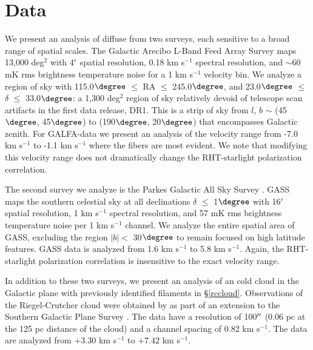 \section{Data}\label{data}
We present an analysis of diffuse \hi from two surveys, each sensitive to a broad range of spatial scales. The Galactic Arecibo L-Band Feed Array \hi Survey \citep[GALFA-\hia;][]{2011ApJS..194...20P} maps 13,000 deg${^2}$ with 4${\mbox{$^\prime$}}$ spatial resolution, 0.18 km s${^{-1}}$ spectral resolution, and ${\sim}$60 mK rms brightness temperature noise for a 1 km s$^{-1}$ velocity bin. We analyze a region of sky with 115.0${\degree}$ ${\le}$ RA ${\le}$ 245.0${\degree}$, and 23.0${\degree}$ ${\le}$ ${\delta}$ ${\le}$ 33.0${\degree}$: a 1,300 deg${^2}$ region of sky relatively devoid of telescope scan artifacts in the first data release, DR1. This is a strip of sky from $l$, $b$ $\sim$ (45$\degree$, 45$\degree$) to (190$\degree$, 20$\degree$) that encompasses Galactic zenith. 
For GALFA-\hi data we present an analysis of the velocity range from -7.0 km s$^{-1}$ to -1.1 km s$^{-1}$ where the fibers are most evident. We note that modifying this velocity range does not dramatically change the RHT-starlight polarization correlation. 

The second survey we analyze is the Parkes Galactic All Sky Survey \citep[GASS;][]{McClureGriffiths:2009dn}.  GASS maps the southern celestial sky at all declinations ${\delta}$ ${\le}$ 1${\degree}$ with 16${\mbox{$^\prime$}}$ spatial resolution, 1 km s${^{-1}}$ spectral resolution, and 57 mK rms brightness temperature noise per 1 km s${^{-1}}$ channel.  We analyze the entire spatial area of GASS, excluding the region ${\left| b \right| <}$ 30${\degree}$ to remain focused on high latitude features.  GASS data is analyzed from 1.6 km s$^{-1}$ to 5.8 km s$^{-1}$. Again, the RHT-starlight polarization correlation is insensitive to the exact velocity range. 

In addition to these two surveys, we present an analysis of an \hi cold cloud in the Galactic plane with previously identified filaments in \S \ref{rccloud}. Observations of the Riegel-Crutcher cloud were obtained by \cite[][hereafter McC-G06]{McClureGriffiths:2006wx} as part of an extension to the Southern Galactic Plane Survey \citep{McClureGriffiths:2005dv}. The data have a resolution of 100${\mbox{$^{\prime\prime}$}}$ (0.06 pc at the 125 pc distance of the cloud) and a channel spacing of 0.82 km s$^{-1}$. The data are analyzed from $+3.30$ km s$^{-1}$ to $+7.42$ km s$^{-1}$. 

